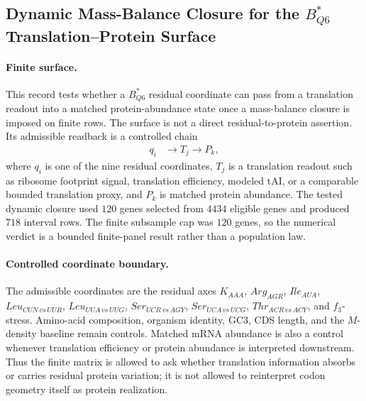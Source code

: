 
\subsection{Dynamic Mass-Balance Closure for the $B^{\ast}_{Q6}$ Translation--Protein Surface}
\label{sec:biorality-bstar-q6-rpf-protein-mass-balance}

\paragraph{Finite surface.}
This record tests whether a $B^{\ast}_{Q6}$ residual coordinate can pass from a translation readout into a matched protein-abundance state once a mass-balance closure is imposed on finite rows.  The surface is not a direct residual-to-protein assertion.  Its admissible readback is a controlled chain
$$
\begin{aligned}
q_i &\longrightarrow T_j \longrightarrow P_k,
\end{aligned}
$$
where $q_i$ is one of the nine residual coordinates, $T_j$ is a translation readout such as ribosome footprint signal, translation efficiency, modeled tAI, or a comparable bounded translation proxy, and $P_k$ is matched protein abundance.  The tested dynamic closure used $120$ genes selected from $4434$ eligible genes and produced $718$ interval rows.  The finite subsample cap was $120$ genes, so the numerical verdict is a bounded finite-panel result rather than a population law.

\paragraph{Controlled coordinate boundary.}
The admissible coordinates are the residual axes $K_{AAA}$, $Arg_{AGR}$, $Ile_{AUA}$, $Leu_{CUN\,vs\,UUR}$, $Leu_{UUA\,vs\,UUG}$, $Ser_{UCR\,vs\,AGY}$, $Ser_{UCA\,vs\,UCG}$, $Thr_{ACR\,vs\,ACY}$, and $f_3$-stress.  Amino-acid composition, organism identity, GC3, CDS length, and the $M$-density baseline remain controls.  Matched mRNA abundance is also a control whenever translation efficiency or protein abundance is interpreted downstream.  Thus the finite matrix is allowed to ask whether translation information absorbs or carries residual protein variation; it is not allowed to reinterpret codon geometry itself as protein realization.

